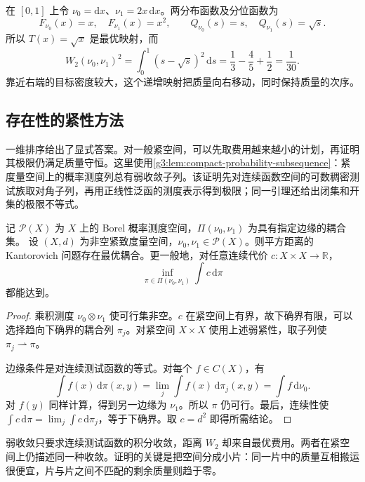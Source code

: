 \begin{example}\label{g3:exm:C-uniform-to-linear-density}
	在 \([0,1]\) 上令 \(\nu_0=\mathrm dx\)、\(\nu_1=2x\,\mathrm dx\)。两分布函数及分位函数为
	\[
		F_{\nu_0}(x)=x,\quad F_{\nu_1}(x)=x^2,
		\qquad Q_{\nu_0}(s)=s,\quad Q_{\nu_1}(s)=\sqrt s.
	\]
	所以 \(T(x)=\sqrt x\) 是最优映射，而
	\[
		W_2(\nu_0,\nu_1)^2
		=\int_0^1(s-\sqrt s)^2\,\mathrm ds
		=\frac13-\frac45+\frac12=\frac1{30}.
	\]
	靠近右端的目标密度较大，这个递增映射把质量向右移动，同时保持质量的次序。
\end{example}

\subsection{存在性的紧性方法}
\label{g3:subsec:C01:02}

一维排序给出了显式答案。对一般紧空间，可以先取费用越来越小的计划，再证明其极限仍满足质量守恒。这里使用\cref{g3:lem:compact-probability-subsequence}：紧度量空间上的概率测度列总有弱收敛子列。该证明先对连续函数空间的可数稠密测试族取对角子列，再用正线性泛函的测度表示得到极限；同一引理还给出闭集和开集的极限不等式。

\begin{theorem}\label{g3:thm:C-optimal-plan-existence}
	记 \(\mathcal P(X)\) 为 \(X\) 上的 Borel 概率测度空间，\(\Pi(\nu_0,\nu_1)\) 为具有指定边缘的耦合集。
	设 \((X,d)\) 为非空紧致度量空间，\(\nu_0,\nu_1\in\mathcal P(X)\)。则平方距离的 Kantorovich 问题存在最优耦合。更一般地，对任意连续代价 \(c:X\times X\rightarrow\mathbb R\)，
	\[
		\inf_{\pi\in\Pi(\nu_0,\nu_1)}\int c\,\mathrm d\pi
	\]
	都能达到。
\end{theorem}
\begin{proof}
	乘积测度 \(\nu_0\otimes\nu_1\) 使可行集非空。\(c\) 在紧空间上有界，故下确界有限，可以选择趋向下确界的耦合列 \(\pi_j\)。对紧空间 \(X\times X\) 使用上述弱紧性，取子列使 \(\pi_j\rightharpoonup\pi\)。

	边缘条件是对连续测试函数的等式。对每个 \(f\in C(X)\)，有
	\[
		\int f(x)\,\mathrm d\pi(x,y)
		=\lim_j\int f(x)\,\mathrm d\pi_j(x,y)
		=\int f\,\mathrm d\nu_0.
	\]
	对 \(f(y)\) 同样计算，得到另一边缘为 \(\nu_1\)。所以 \(\pi\) 仍可行。最后，连续性使
	\(\int c\,\mathrm d\pi=\lim_j\int c\,\mathrm d\pi_j\)，等于下确界。取 \(c=d^2\) 即得所需结论。
\end{proof}

弱收敛只要求连续测试函数的积分收敛，距离 \(W_2\) 却来自最优费用。两者在紧空间上仍描述同一种收敛。证明的关键是把空间分成小片：同一片中的质量互相搬运很便宜，片与片之间不匹配的剩余质量则趋于零。

